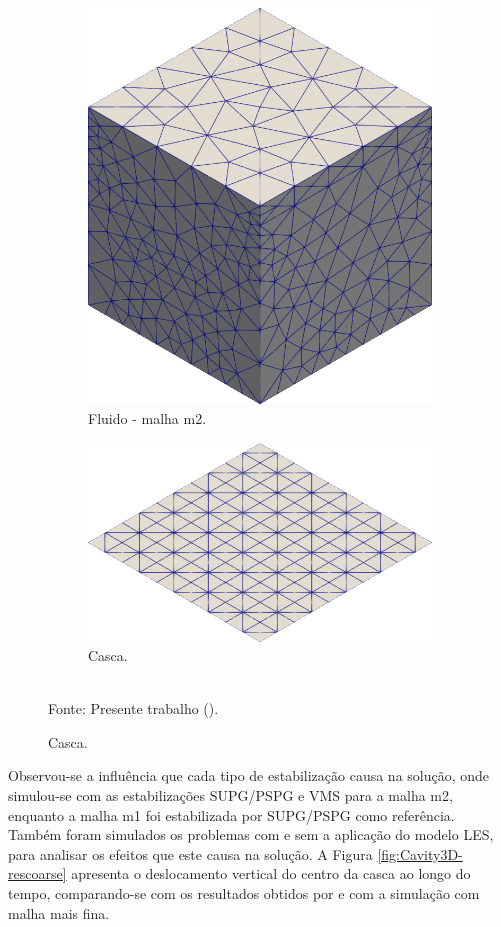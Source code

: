 \begin{figure}[h!]
\begin{subfigure}[b]{0.4\textwidth}
        \includegraphics[width=.85\linewidth]{Figuras/FSI-Cavity3D/fm2.png}
        \caption{Fluido - malha m2.}
    \end{subfigure}
    \begin{subfigure}[b]{0.4\textwidth}
        \centering
        \includegraphics[width=\linewidth]{Figuras/FSI-Cavity3D/shell-mesh.png}
        \caption{Casca.}
    \end{subfigure}
    \\Fonte: Presente trabalho (\the\year).
    \label{fig:Cavity3D-mesh}
\end{figure}

Observou-se a influência que cada tipo de estabilização causa na solução, onde simulou-se com as estabilizações SUPG/PSPG e VMS para a malha m2, enquanto a malha m1 foi estabilizada por SUPG/PSPG como referência. Também foram simulados os problemas com e sem a aplicação do modelo LES, para analisar os efeitos que este causa na solução. A Figura \ref{fig:Cavity3D-rescoarse} apresenta o deslocamento vertical do centro da casca ao longo do tempo, comparando-se com os resultados obtidos por  e com a simulação com malha mais fina.

